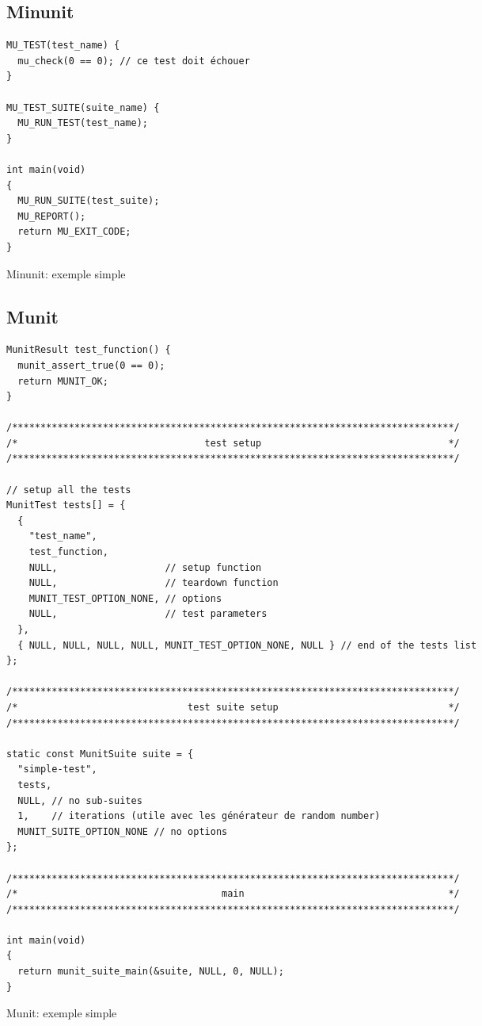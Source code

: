 \documentclass[a4paper]{article}
\begin{document}
\subsection*{Minunit}

\begin{listing}[ht!]
\begin{verbatim}
MU_TEST(test_name) {
  mu_check(0 == 0); // ce test doit échouer
}

MU_TEST_SUITE(suite_name) {
  MU_RUN_TEST(test_name);
}

int main(void)
{
  MU_RUN_SUITE(test_suite);
  MU_REPORT();
  return MU_EXIT_CODE;
}
\end{verbatim}
\caption{Minunit: exemple simple}
\label{minunit-example}
\end{listing}

\clearpage{}
\subsection*{Munit}

\begin{listing}[ht!]
\begin{verbatim}
MunitResult test_function() {
  munit_assert_true(0 == 0);
  return MUNIT_OK;
}

/******************************************************************************/
/*                                 test setup                                 */
/******************************************************************************/

// setup all the tests
MunitTest tests[] = {
  {
    "test_name",
    test_function,
    NULL,                   // setup function
    NULL,                   // teardown function
    MUNIT_TEST_OPTION_NONE, // options
    NULL,                   // test parameters
  },
  { NULL, NULL, NULL, NULL, MUNIT_TEST_OPTION_NONE, NULL } // end of the tests list
};

/******************************************************************************/
/*                              test suite setup                              */
/******************************************************************************/

static const MunitSuite suite = {
  "simple-test",
  tests,
  NULL, // no sub-suites
  1,    // iterations (utile avec les générateur de random number)
  MUNIT_SUITE_OPTION_NONE // no options
};

/******************************************************************************/
/*                                    main                                    */
/******************************************************************************/

int main(void)
{
  return munit_suite_main(&suite, NULL, 0, NULL);
}
\end{verbatim}
\caption{Munit: exemple simple}
\label{munit-example}
\end{listing}
\end{document}
